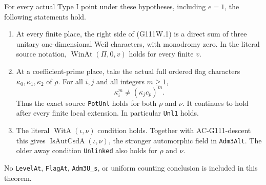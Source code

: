 \begin{theorem}
\label{AC-G111-witness}
For every actual Type I point under these hypotheses,
including \(e=1\), the following statements hold.
\begin{enumerate}
\item At every finite place, the right side of (G111W.1)
is a direct sum of three unitary one-dimensional Weil
characters, with monodromy zero. In the literal source
notation, \(\operatorname{WinAt}(\Pi,0,v)\) holds for
every finite \(v\).
\item At a coefficient-prime place, take the actual full
ordered flag characters \(\kappa_0,\kappa_1,\kappa_2\)
of \(\rho\). For all \(i,j\) and all integers \(m\ge1\),
\[
                  \kappa_i^m\ne(\kappa_j c_p)^m.
 \tag{G111W.2}
\]
Thus the exact source \texttt{PotUnl} holds for both
\(\rho\) and \(\nu\). It continues to hold after every
finite local extension. In particular \texttt{Unl1} holds.
\item The literal \(\operatorname{WitA}(\iota,\nu)\)
condition holds. Together with AC-G111-descent this gives
\(\operatorname{IsAutCsdA}(\iota,\nu)\), the stronger
automorphic field in \texttt{Adm3Alt}. The older away
condition \texttt{Unlinked} also holds for \(\rho\)
and \(\nu\).
\end{enumerate}
No \texttt{LevelAt}, \texttt{FlagAt}, \texttt{Adm3U\_s},
or uniform counting conclusion is included in this theorem.
\end{theorem}
